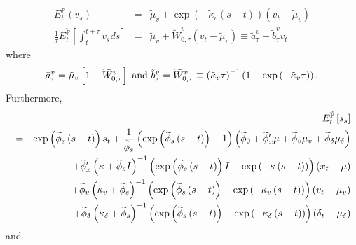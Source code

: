 \documentclass{article}
\begin{document}
\begin{eqnarray*}
E_{t}^{\mathbb{\tilde{P}}}\left( v_{s}\right) &=&\tilde{\mu}_{v}+\exp \left(
-\tilde{\kappa}_{v}\left( s-t\right) \right) \left( v_{t}-\tilde{\mu}%
_{v}\right) \\
\frac{1}{\tau }E_{t}^{\mathbb{\tilde{P}}}\left[ \int_{t}^{t+\tau }v_{s}ds%
\right] &=&\tilde{\mu}_{v}+\widetilde{W}_{0,\tau }^{v}\left( v_{t}-\tilde{\mu%
}_{v}\right) \equiv \tilde{a}_{\tau }^{v}+\tilde{b}_{\tau }^{v}v_{t}
\end{eqnarray*}%
where 
\begin{equation*}
\tilde{a}_{\tau }^{v}=\tilde{\mu}_{v}\left[ 1-\widetilde{W}_{0,\tau }^{v}%
\right] \text{ and }\tilde{b}_{\tau }^{v}=\widetilde{W}_{0,\tau }^{v}\equiv
\left( \tilde{\kappa}_{v}\tau \right) ^{-1}\left( 1-\exp \left( -\tilde{%
\kappa}_{v}\tau \right) \right) .
\end{equation*}%
Furthermore,%
\begin{eqnarray*}
&&E_{t}^{\mathbb{\tilde{P}}}\left[ s_{s}\right] \\
&=&\exp \left( \widetilde{\phi }_{s}\left( s-t\right) \right) s_{t}+\frac{1}{%
\widetilde{\phi }_{s}}\left( \exp \left( \widetilde{\phi }_{s}\left(
s-t\right) \right) -1\right) \left( \widetilde{\phi }_{0}+\widetilde{\phi }%
_{x}^{\prime }\mu +\widetilde{\phi }_{v}\mu _{v}+\widetilde{\phi }_{\delta
}\mu _{\delta }\right) \\
&&+\widetilde{\phi }_{x}^{\prime }\left( \kappa +\widetilde{\phi }%
_{s}I\right) ^{-1}\left( \exp \left( \widetilde{\phi }_{s}\left( s-t\right)
\right) I-\exp \left( -\kappa \left( s-t\right) \right) \right) \left(
x_{t}-\mu \right) \\
&&+\widetilde{\phi }_{v}\left( \kappa _{v}+\widetilde{\phi }_{s}\right)
^{-1}\left( \exp \left( \widetilde{\phi }_{s}\left( s-t\right) \right) -\exp
\left( -\kappa _{v}\left( s-t\right) \right) \right) \left( v_{t}-\mu
_{v}\right) \\
&&+\widetilde{\phi }_{\delta }\left( \kappa _{\delta }+\widetilde{\phi }%
_{s}\right) ^{-1}\left( \exp \left( \widetilde{\phi }_{s}\left( s-t\right)
\right) -\exp \left( -\kappa _{\delta }\left( s-t\right) \right) \right)
\left( \delta _{t}-\mu _{\delta }\right)
\end{eqnarray*}%
and%
\end{document}

